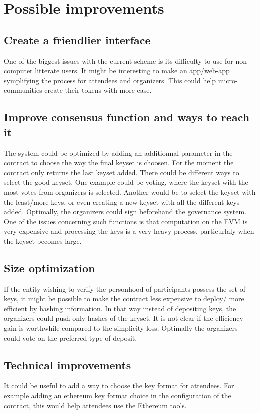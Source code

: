 \documentclass[11pt, a4paper, twoside, openright]{article} %
\begin{document}
\section{Possible improvements}

\subsection{Create a friendlier interface}
One of the biggest issues with the current scheme is its difficulty to use for non computer litterate users. It might be interesting to make an app/web-app symplifying the process for attendees and organizers. This could help micro-communities create their tokens with more ease.

\subsection{Improve consensus function and ways to reach it}
The system could be optimized by adding an additionnal parameter in the contract to choose the way the final keyset is choosen. For the moment the contract only returns the last keyset added. There could be different ways to select the good keyset. One example could be voting, where the keyset with the most votes from organizers is selected. Another would be to select the keyset with the least/more keys, or even creating a new keyset with all the different keys added. Optimally, the organizers could sign beforehand the governance system. One of the issues concerning such functions is that computation on the EVM is very expensive and processing the keys is a very heavy process, particurlaly when the keyset becomes large.

\subsection{Size optimization}
If the entity wishing to verify the personhood of participants possess the set of keys, it might be possible to make the contract less expensive to deploy/ more efficient by hashing information. In that way instead of depositing keys, the organizers could push only hashes of the keyset. It is not clear if the efficiency gain is worthwhile compared to the simplicity loss. Optimally the organizers could vote on the preferred type of deposit.

\subsection{Technical improvements}
It could be useful to add a way to choose the key format for attendees. For example adding an ethereum key format choice in the configuration of the contract, this would help attendees use the Ethereum tools.
\end{document}
